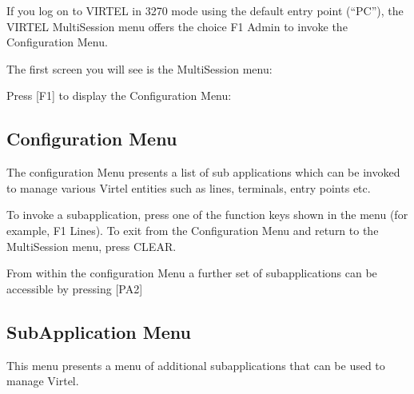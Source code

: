 \documentclass[letterpaper,10pt,english]{sphinxmanual}
\begin{document}
\sphinxAtStartPar
If you log on to VIRTEL in 3270 mode using the default entry point (“PC”), the VIRTEL Multi\sphinxhyphen{}Session menu offers the choice F1 \textendash{} Admin to invoke the Configuration Menu.

\sphinxAtStartPar
The first screen you will see is the Multi\sphinxhyphen{}Session menu:

\sphinxAtStartPar
{}

\sphinxAtStartPar
Press {[}F1{]} to display the Configuration Menu:

\newpage

\ignorespaces 

\subsection{Configuration Menu}
\label{\detokenize{connectivity_guide:configuration-menu}}\label{\detokenize{connectivity_guide:index-1}}
\sphinxAtStartPar
The configuration Menu presents a list of sub applications which can be invoked to manage various Virtel entities such as lines, terminals, entry points etc.

\sphinxAtStartPar
{}

\sphinxAtStartPar
To invoke a sub\sphinxhyphen{}application, press one of the function keys shown in the menu (for example, F1 \textendash{} Lines). To exit from the Configuration Menu and return to the Multi\sphinxhyphen{}Session menu, press CLEAR.

\sphinxAtStartPar
From within the configuration Menu a further set of sub\sphinxhyphen{}applications can be accessible by pressing {[}PA2{]}

\newpage

\ignorespaces 

\subsection{Sub\sphinxhyphen{}Application Menu}
\label{\detokenize{connectivity_guide:sub-application-menu}}\label{\detokenize{connectivity_guide:index-2}}
\sphinxAtStartPar
This menu presents a menu of additional sub\sphinxhyphen{}applications that can be used to manage Virtel.
\end{document}
